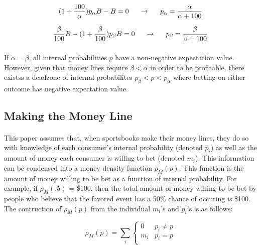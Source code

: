 \documentclass[12pt,letterpaper]{article}
\begin{document}
\begin{equation}
(1+ \frac{100}{\alpha} )p_\alpha B - B = 0 \hskip .2in \rightarrow \hskip .2in p_\alpha = \frac{\alpha}{\alpha + 100}      
\end{equation}

\begin{equation}
\frac{\beta}{100} B  - (1+\frac{\beta}{100})p_\beta B = 0 \hskip .2in \rightarrow \hskip .2in p_\beta= \frac{\beta}{\beta + 100}      
\end{equation}

\paragraph{} If $\alpha = \beta$, all internal probabilities $p$ have a non-negative expectation value. However, given that money lines require $\beta < \alpha$ in order to be profitable, there existss a deadzone of internal probabilites $p_{\beta} < p < p_{\alpha}$ where betting on either outcome has negative expectation value. 

\subsection{Making the Money Line}

\paragraph{} This paper assumes that, when sportsbooks make their money lines, they do so with knowledge of each consumer's internal probability (denoted $p_{i}$) as well as the amount of money each consumer is willing to bet (denoted $m_{i}$). This information can be condensed into a money density function $\rho_M(p)$. This function is the amount of money willing to be bet as a function of internal probability. For example, if $\rho_M(.5)$ = \$100, then the total amount of money willing to be bet by people who believe that the favored event has a 50\% chance of occuring is \$100. The contruction of $\rho_M(p)$ from the individual $m_i$'s and $p_i$'s is as follows:

\begin{equation}
\rho_M(p) = \sum_{i}
   \begin{cases} 
     0 & p_i \neq p \\
     m_i & p_i = p \\
   \end{cases}
\end{equation}
\end{document}

